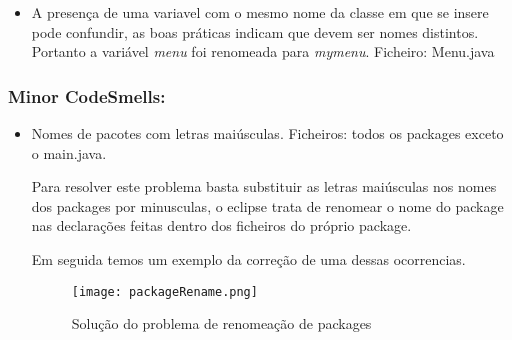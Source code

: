 \begin{itemize}
\item A presença de uma variavel com o mesmo nome da classe em que se insere pode confundir, as boas práticas indicam que devem ser nomes distintos. Portanto a variável \textit{menu} foi renomeada para \textit{mymenu}. \newline
Ficheiro: Menu.java \newline

\end{itemize}

\subsubsection{Minor CodeSmells:}
\begin{itemize}
\item Nomes de pacotes com letras maiúsculas.\newline
 Ficheiros: todos os packages exceto o main.java.\newline


\par Para resolver este problema basta substituir as letras maiúsculas nos nomes dos packages por minusculas, o eclipse trata de renomear o nome do package nas declarações feitas dentro dos ficheiros do próprio package.\newline
\par Em seguida temos um exemplo da correção de uma dessas ocorrencias. 
\begin{figure}[H]

  \centering

  \texttt{[image: packageRename.png]}

  \caption {Solução do problema de renomeação de packages}

  \label {fig16}

\end{figure}

\end{itemize}

